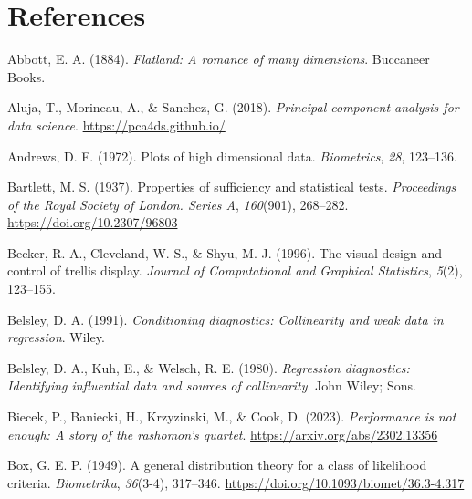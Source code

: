 \documentclass[
  letterpaper,
  10pt,
  krantz2]{krantz}
\newlength{\cslhangindent}
\newlength{\cslentryspacingunit} %
\newenvironment{CSLReferences}[2] %
 {%
  \setlength{\parindent}{0pt}
  \ifodd #1
  \let\oldpar\par
  \def\par{\hangindent=\cslhangindent\oldpar}
  \fi
  \setlength{\parskip}{#2\cslentryspacingunit}
 }%
 {}
\begin{document}

\hypertarget{references}{%
\chapter*{References}\label{references}}


\hypertarget{refs}{}
\begin{CSLReferences}{1}{0}
\leavevmode{}%
Abbott, E. A. (1884). \emph{Flatland: A romance of many dimensions}.
Buccaneer Books.

\leavevmode{}%
Aluja, T., Morineau, A., \& Sanchez, G. (2018). \emph{Principal
component analysis for data science}. \url{https://pca4ds.github.io/}

\leavevmode{}%
Andrews, D. F. (1972). Plots of high dimensional data.
\emph{Biometrics}, \emph{28}, 123--136.

\leavevmode{}%
Bartlett, M. S. (1937). Properties of sufficiency and statistical tests.
\emph{Proceedings of the Royal Society of London. Series A},
\emph{160}(901), 268--282. \url{https://doi.org/10.2307/96803}

\leavevmode{}%
Becker, R. A., Cleveland, W. S., \& Shyu, M.-J. (1996). The visual
design and control of trellis display. \emph{Journal of Computational
and Graphical Statistics}, \emph{5}(2), 123--155.

\leavevmode{}%
Belsley, D. A. (1991). \emph{Conditioning diagnostics: Collinearity and
weak data in regression}. Wiley.

\leavevmode{}%
Belsley, D. A., Kuh, E., \& Welsch, R. E. (1980). \emph{Regression
diagnostics: Identifying influential data and sources of collinearity}.
John Wiley; Sons.

\leavevmode{}%
Biecek, P., Baniecki, H., Krzyzinski, M., \& Cook, D. (2023).
\emph{Performance is not enough: A story of the rashomon's quartet}.
\url{https://arxiv.org/abs/2302.13356}

\leavevmode{}%
Box, G. E. P. (1949). A general distribution theory for a class of
likelihood criteria. \emph{Biometrika}, \emph{36}(3-4), 317--346.
\url{https://doi.org/10.1093/biomet/36.3-4.317}


\end{CSLReferences}
\end{document}
